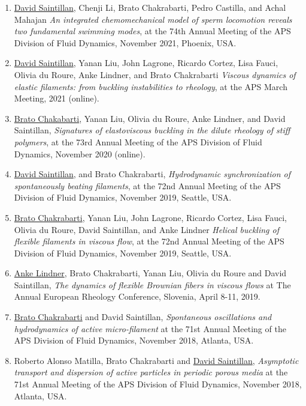 \documentclass[10pt]{res} %
\begin{document}
\begin{resume}
\begin{enumerate}
\item \underline{David Saintillan}, Chenji Li, Brato Chakrabarti, Pedro Castilla, and Achal Mahajan \textit{An integrated chemomechanical model of sperm locomotion reveals two fundamental swimming modes}, at the 74th Annual Meeting of the APS Division of Fluid Dynamics, November 2021, Phoenix, USA.

\item \underline{David Saintillan}, Yanan Liu, John Lagrone, Ricardo Cortez, Lisa Fauci, Olivia du Roure, Anke Lindner, and Brato Chakrabarti \textit{Viscous dynamics of elastic filaments: from buckling instabilities to rheology},  at the APS March Meeting,  2021 (online).


\item \underline{Brato Chakabarti}, Yanan Liu, Olivia du Roure, Anke Lindner, and David Saintillan, \textit{Signatures of elastoviscous buckling in the dilute rheology of stiff polymers}, at the 73rd Annual Meeting of the APS Division of Fluid Dynamics, November 2020 (online).

\item \underline{David Saintillan}, and Brato Chakrabarti, \textit{Hydrodynamic synchronization of spontaneously beating filaments}, at the 72nd Annual Meeting of the APS Division of Fluid Dynamics, November 2019, Seattle, USA.

\item \underline{Brato Chakrabarti}, Yanan Liu, John Lagrone, Ricardo Cortez, Lisa Fauci, Olivia du Roure, David Saintillan, and Anke Lindner \textit{Helical buckling of flexible filaments in viscous flow},  at the 72nd Annual Meeting of the APS Division of Fluid Dynamics, November 2019, Seattle, USA.

\item \underline{Anke Lindner}, Brato Chakrabarti, Yanan Liu, Olivia du Roure and David Saintillan, \textit{The dynamics of flexible Brownian fibers in viscous flows} at  The Annual European Rheology Conference, Slovenia, April 8-11, 2019.

\item \underline{Brato Chakrabarti} and David Saintillan, \textit{Spontaneous oscillations and hydrodynamics of active micro-filament} at the 71st Annual Meeting of the APS Division of Fluid Dynamics, November 2018, Atlanta, USA. 

\item Roberto Alonso Matilla, Brato Chakrabarti and \underline{David Saintillan}, \textit{Asymptotic transport and dispersion of active particles in periodic porous media} at the 71st Annual Meeting of the APS Division of Fluid Dynamics, November 2018, Atlanta, USA. 


\end{enumerate}
\end{resume}
\end{document}
